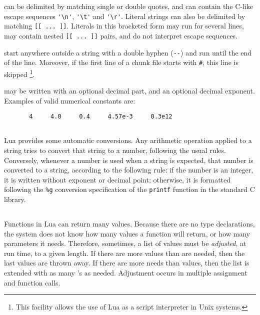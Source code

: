  can be delimited by matching single or double quotes,
and can contain the C-like escape sequences
\verb-'\n'-, \verb-'\t'- and \verb-'\r'-.
Literal strings can also be delimited by matching \verb'[[ ... ]]'.
Literals in this bracketed form may run for several lines,
may contain nested \verb'[[ ... ]]' pairs,
and do not interpret escape sequences.

 start anywhere outside a string with a
double hyphen (\verb'--') and run until the end of the line.
Moreover, if the first line of a chunk file starts with \verb'#',
this line is skipped%
\footnote{This facility allows the use of Lua as a script interpreter
in Unix systems.}.

 may be written with an optional decimal part,
and an optional decimal exponent.
Examples of valid numerical constants are:
\begin{verbatim}
       4     4.0     0.4     4.57e-3     0.3e12
\end{verbatim}


\subsection{} \label{coercion}

Lua provides some automatic conversions.
Any arithmetic operation applied to a string tries to convert
that string to a number, following the usual rules.
Conversely, whenever a number is used when a string is expected,
that number is converted to a string, according to the following rule:
if the number is an integer, it is written without exponent or decimal point;
otherwise, it is formatted following the \verb'%g'
conversion specification of the \verb'printf' function in the
standard C library.



\subsection{} \label{adjust}

Functions in Lua can return many values.
Because there are no type declarations,
the system does not know how many values a function will return,
or how many parameters it needs.
Therefore, sometimes, a list of values must be {\em adjusted\/}, at run time,
to a given length.
If there are more values than are needed, then the last values are thrown away.
If there are more needs than values, then the list is extended with as
many  \nil's as needed.
Adjustment occurs in multiple assignment and function calls.


